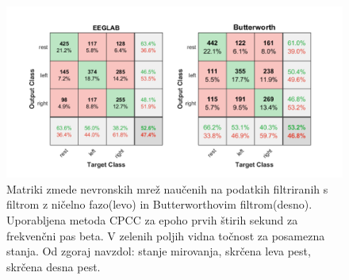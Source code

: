\begin{figure}
    \begin{center}
    \includegraphics[width=1\linewidth]{slike/ComparisonFilters2.png}
    \end{center}
    \caption[Matriki zmede nevronskih mrež za frekvenčno območje beta.]{Matriki zmede nevronskih mrež naučenih na podatkih filtriranih s filtrom z ničelno fazo(levo) in Butterworthovim filtrom(desno). Uporabljena metoda CPCC za epoho prvih štirih sekund za frekvenčni pas beta. V zelenih poljih vidna točnost za posamezna stanja. Od zgoraj navzdol: stanje mirovanja, skrčena leva pest, skrčena desna pest.}
    \label{slika:filter_matrika}
    \end{figure}

